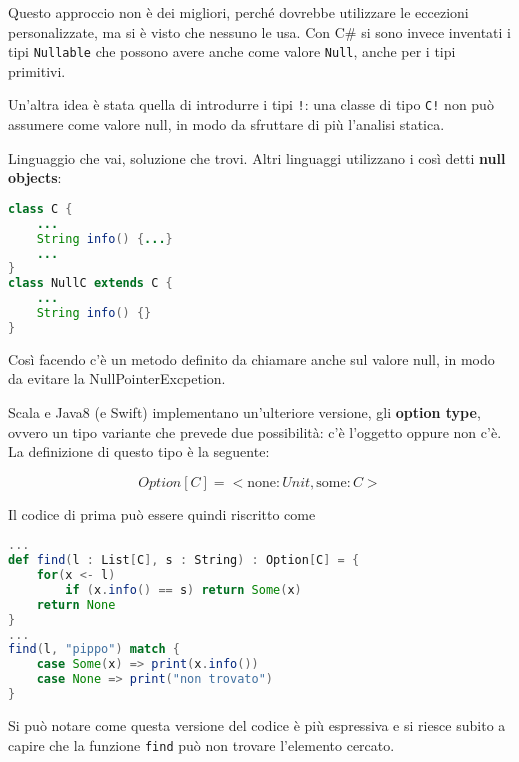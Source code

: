\noindent Questo approccio non è dei migliori, perché dovrebbe utilizzare le eccezioni personalizzate, ma si è visto che nessuno le usa. Con C\# si sono invece inventati i tipi \texttt{Nullable} che possono avere anche come valore \texttt{Null}, anche per i tipi primitivi.

Un'altra idea è stata quella di introdurre i tipi \texttt{!}: una classe di tipo \texttt{C!} non può assumere come valore null, in modo da sfruttare di più l'analisi statica.

Linguaggio che vai, soluzione che trovi. Altri linguaggi utilizzano i così detti \textbf{null objects}:

\begin{lstlisting}[language=Java]
class C {
	...
	String info() {...}
	...
}
class NullC extends C {
	...
	String info() {}
}
\end{lstlisting}

\noindent Così facendo c'è un metodo definito da chiamare anche sul valore null, in modo da evitare la NullPointerExcpetion.

Scala e Java8 (e Swift) implementano un'ulteriore versione, gli \textbf{option type}, ovvero un tipo variante che prevede due possibilità: c'è l'oggetto oppure non c'è.
La definizione di questo tipo è la seguente:

$$
Option[C] = < \text{none} : Unit, \text{some} : C >
$$

\noindent Il codice di prima può essere quindi riscritto come

\begin{lstlisting}[language=Scala]
...
def find(l : List[C], s : String) : Option[C] = {
	for(x <- l) 
		if (x.info() == s) return Some(x)
	return None 
}
...
find(l, "pippo") match {
	case Some(x) => print(x.info())
	case None => print("non trovato")
}
\end{lstlisting}

\noindent Si può notare come questa versione del codice è più espressiva e si riesce subito a capire che la funzione \texttt{find} può non trovare l'elemento cercato.


